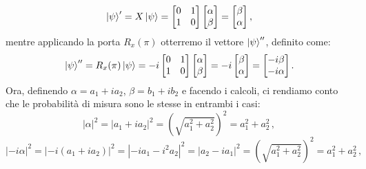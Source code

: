 \documentclass{book}
\theoremstyle{definition}
\theoremstyle{definition}
\theoremstyle{definition}
\theoremstyle{plain}
\theoremstyle{plain}
\theoremstyle{plain}
\theoremstyle{plain}
\begin{document}
\begin{displaymath}
    \ket{\psi}' = X \ket{\psi} = 
    \begin{bmatrix}
    0 & 1\\
    1 & 0
    \end{bmatrix}
    \begin{bmatrix}
    \alpha\\
    \beta
    \end{bmatrix} = 
    \begin{bmatrix}
    \beta\\
    \alpha
    \end{bmatrix} ,
\end{displaymath}
mentre applicando la porta $R_x(\pi)$ otterremo il vettore $\ket{\psi}''$, definito come:
\begin{displaymath}
    \ket{\psi}'' = R_x(\pi) \ket{\psi} = -i 
    \begin{bmatrix}
    0 & 1\\
    1 & 0
    \end{bmatrix}
    \begin{bmatrix}
    \alpha\\
    \beta
    \end{bmatrix} = -i 
    \begin{bmatrix}
    \beta\\
    \alpha
    \end{bmatrix} =
    \begin{bmatrix}
    -i \beta\\
    -i \alpha
    \end{bmatrix} .
\end{displaymath}
Ora, definendo $\alpha = a_1 + i a_2$, $\beta = b_1 + i b_2$ e facendo i calcoli, ci rendiamo conto che le probabilità di misura sono le stesse in entrambi i casi:
\begin{displaymath}
\left\lvert \alpha \right\rvert^{2} = \left\lvert a_{1} + i a_{2} \right\rvert^{2} = \left(\sqrt{a_{1}^{2} + a_{2}^2}\right)^{2} = a_{1}^{2} + a_{2}^2\, ,
\end{displaymath}
\begin{displaymath}
\left\lvert -i\alpha \right\rvert^{2} = \left\lvert -i(a_{1} + i a_{2}) \right\rvert^{2} =  \left\lvert -i a_{1} - i^{2} a_{2} \right\rvert^{2} = \left\lvert a_{2} -i a_{1} \right\rvert^{2} = \left(\sqrt{a_{1}^{2} + a_{2}^2}\right)^{2} = a_{1}^{2} + a_{2}^2\, ,
\end{displaymath}
\end{document}
